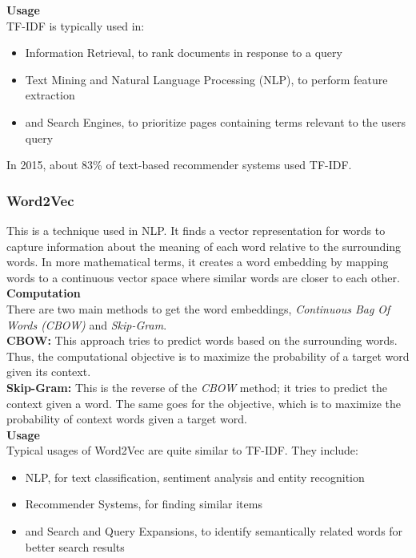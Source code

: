 \documentclass[a4paper,12pt]{article}
\begin{document}
\noindent \textbf{Usage}\\
TF-IDF is typically used in:
\begin{itemize}
    \item Information Retrieval, to rank documents in response to a query
    \item Text Mining and Natural Language Processing (NLP), to perform feature extraction
    \item and Search Engines, to prioritize pages containing terms relevant to the users query
\end{itemize}
In 2015, about 83\% of text-based recommender systems used TF-IDF. 


\subsubsection{Word2Vec}
This is a technique used in NLP. It finds a vector representation for words to capture information about the meaning of each word relative to the surrounding words. In more mathematical terms, it creates a word embedding by mapping words to a continuous vector space where similar words are closer to each other.\\

\noindent \textbf{Computation}\\
There are two main methods to get the word embeddings, \textit{Continuous Bag Of Words (CBOW)} and \textit{Skip-Gram}.\\
\textbf{CBOW:} This approach tries to predict words based on the surrounding words. Thus, the computational objective is to maximize the probability of a target word given its context.\\
\textbf{Skip-Gram:} This is the reverse of the \textit{CBOW} method; it tries to predict the context given a word. The same goes for the objective, which is to maximize the probability of context words given a target word.\\

\noindent \textbf{Usage}\\
Typical usages of Word2Vec are quite similar to TF-IDF. They include:
\begin{itemize}
    \item NLP, for text classification, sentiment analysis and entity recognition
    \item Recommender Systems, for finding similar items
    \item and Search and Query Expansions, to identify semantically related words for better search results
\end{itemize}
\end{document}

